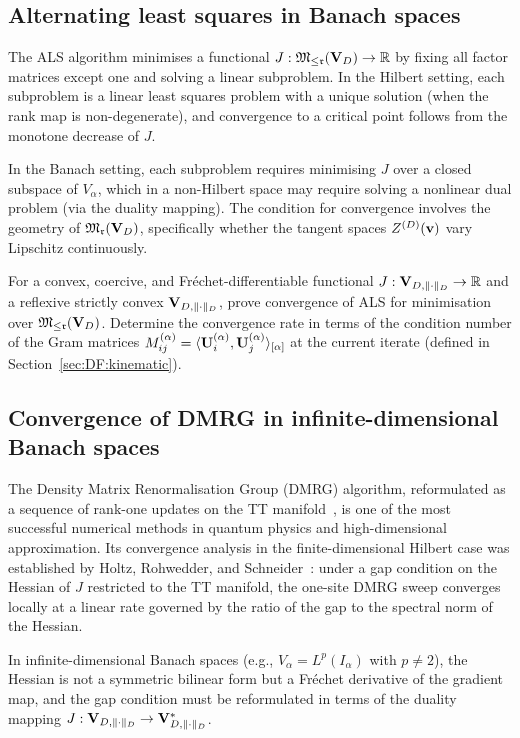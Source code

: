 \subsection*{Alternating least squares in Banach spaces}

The ALS algorithm minimises a functional $J: \mathfrak{M}_{\leq\mathfrak{r}}(\mathbf{V}_D) \to \mathbb{R}$
by fixing all factor matrices except one and solving a linear subproblem.
In the Hilbert setting, each subproblem is a linear least squares problem
with a unique solution (when the rank map is non-degenerate), and
convergence to a critical point follows from the monotone decrease of $J$.

In the Banach setting, each subproblem requires minimising $J$ over a
closed subspace of $V_\alpha$, which in a non-Hilbert space may require
solving a nonlinear dual problem (via the duality mapping). The condition
for convergence involves the geometry of $\mathfrak{M}_{\mathfrak{r}}(\mathbf{V}_D)$, specifically
whether the tangent spaces $Z^{(D)}(\mathbf{v})$ vary Lipschitz continuously.

\begin{problem}
\label{prob:ALS}
For a convex, coercive, and Fréchet-differentiable functional
$J: \mathbf{V}_{D,\|\cdot\|_D} \to \mathbb{R}$ and a reflexive strictly convex $\mathbf{V}_{D,\|\cdot\|_D}$, prove
convergence of ALS for minimisation over $\mathfrak{M}_{\leq\mathfrak{r}}(\mathbf{V}_D)$.
Determine the convergence rate in terms of the condition number of
the Gram matrices $M^{(\alpha)}_{ij} = \langle \mathbf{U}^{(\alpha)}_i,
\mathbf{U}^{(\alpha)}_j\rangle_{[\alpha]}$ at the current iterate (defined
in Section~\ref{sec:DF:kinematic}).
\end{problem}

\subsection*{Convergence of DMRG in infinite-dimensional Banach spaces}

The Density Matrix Renormalisation Group (DMRG) algorithm, reformulated
as a sequence of rank-one updates on the TT manifold~\cite{Oseledets2011},
is one of the most successful numerical methods in quantum physics and
high-dimensional approximation. Its convergence analysis in the
finite-dimensional Hilbert case was established by
Holtz, Rohwedder, and Schneider~\cite{HoltzRohwedderSchneider2012}: under
a gap condition on the Hessian of $J$ restricted to the TT manifold,
the one-site DMRG sweep converges locally at a linear rate governed by
the ratio of the gap to the spectral norm of the Hessian.

In infinite-dimensional Banach spaces (e.g., $V_\alpha = L^p(I_\alpha)$
with $p \neq 2$), the Hessian is not a symmetric bilinear form but a
Fréchet derivative of the gradient map, and the gap condition must be
reformulated in terms of the duality mapping $J: \mathbf{V}_{D,\|\cdot\|_D} \to \mathbf{V}_{D,\|\cdot\|_D}^*$.


